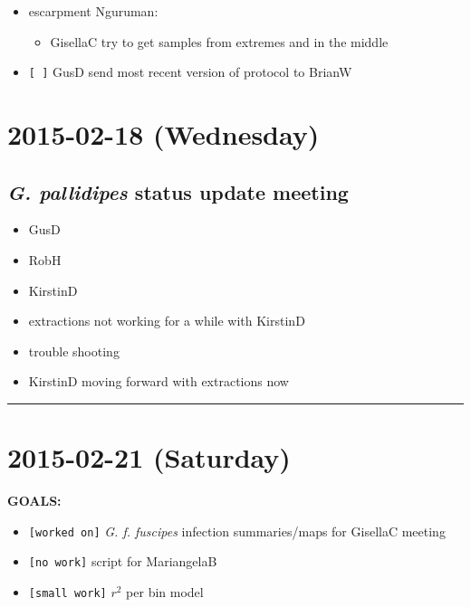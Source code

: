 \documentclass[letterpaper]{scrartcl}
\begin{document}
\begin{itemize}
\itemsep1pt\parskip0pt
\item
  escarpment Nguruman:

  \begin{itemize}
  \itemsep1pt\parskip0pt
  \item
    GisellaC try to get samples from extremes and in the middle
  \end{itemize}
\item
  \texttt{{[} {]}} GusD send most recent version of protocol to BrianW
\end{itemize}

\section{2015-02-18 (Wednesday)}\label{wednesday-1}

\subsection{\emph{G. pallidipes} status update
meeting}\label{g.-pallidipes-status-update-meeting}

\begin{itemize}
\item
  GusD
\item
  RobH
\item
  KirstinD
\item
  extractions not working for a while with KirstinD
\item
  trouble shooting
\item
  KirstinD moving forward with extractions now
\end{itemize}

\begin{center}\rule{0.5\linewidth}{\linethickness}\end{center}

\section{2015-02-21 (Saturday)}\label{saturday-1}

\textbf{GOALS:}

\begin{itemize}
\itemsep1pt\parskip0pt
\item
  \texttt{{[}worked on{]}} \emph{G. f. fuscipes} infection
  summaries/maps for GisellaC meeting
\item
  \texttt{{[}no work{]}} script for MariangelaB
\item
  \texttt{{[}small work{]}} \(r^2\) per bin model
\end{itemize}
\end{document}
